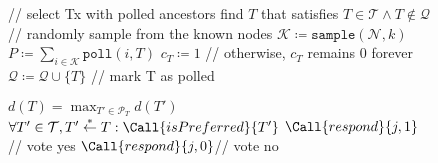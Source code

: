 \begin{figure}
\begin{center}
\small
\begin{algorithmic}[1]
            \State \textrm{// select Tx with polled ancestors}
            \State\textrm{find  $T$ that satisfies }%
            $T \in \mathcal{T} \land T \notin \mathcal{Q}$
            \State \textrm{// randomly sample from the known nodes}
            \State $\mathcal{K} \coloneqq \texttt{sample}(\mathcal{N}, k)$
            \State $P \coloneqq \sum_{i \in \mathcal{K}}\texttt{poll}(i, T)$
                \State $c_T \coloneqq 1$
            \EndIf
            \State\textrm{// otherwise, }$c_T$\textrm{ remains 0 forever}
            \State $\mathcal{Q} \coloneqq \mathcal{Q} \cup \{T\}$ \hspace {1ex} \textrm{// mark T as polled}
        \EndWhile
    \EndProcedure
    \label{fig:gossipchain-main}
\end{algorithmic}
\end{center}
\end{figure}

\begin{figure}
\begin{center}
\small
\begin{algorithmic}[1]
        \State \Return $d(T) = \max_{T' \in \mathcal{P}_T} d(T')$
    \EndFunction
        \State \Return $\forall T'\in\mathcal{T}, T' \stackrel{*}{\gets} T: \Call{isPreferred}{T'}$
    \EndFunction
        \State {}
            \State $\Call{respond}{j, 1}$\hspace{2ex}\textrm{// vote yes}
        \Else
            \State $\Call{respond}{j, 0}$\hspace{2ex}\textrm{// vote no}
        \EndIf
    \EndProcedure
    \label{fig:gossipchain-onpoll}
\end{algorithmic}
\end{center}
\end{figure}

